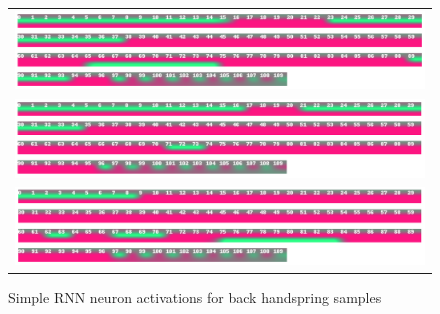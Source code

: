 \begin{figure}
   \centering
\begin{tabular}{c}
\includegraphics[width=\textwidth]{images/classifier/neuron-activations-simple-rnn-model-3/flack-19-rasmus}\\
\includegraphics[width=\textwidth]{images/classifier/neuron-activations-simple-rnn-model-3/flack-31-rasmus}\\
\includegraphics[width=\textwidth]{images/classifier/neuron-activations-simple-rnn-model-3/flack-55-martin}\\
\end{tabular}
    \caption{Simple RNN neuron activations for back handspring samples}
    \label{back-handspring-neuron-activations-simple-rnn}
\end{figure}










